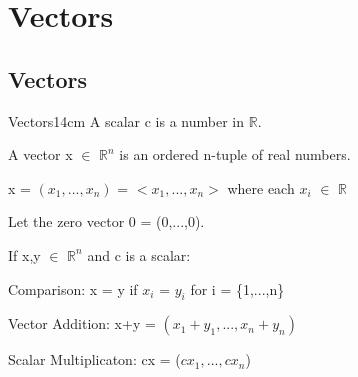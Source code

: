 \section[Day 1: Vectors]{ Vectors }

\subsection{ Vectors }

    \begin{definition}{Vectors}{14cm}
        A {\color{lblue} scalar} c is a number in $\mathbb{R}$.

        A {\color{lblue} vector} x $\in$ $\mathbb{R}^n$
        is an ordered n-tuple of real numbers.

        \hspace{0.5cm}
        x = $(x_1,...,x_n)$ = $<x_1,...,x_n>$
        \hspace{1cm}
        where each $x_i$ $\in$ $\mathbb{R}$

        Let the zero vector 0 = (0,...,0).

        \vspace{0.3cm}

        If x,y $\in$ $\mathbb{R}^n$ and c is a scalar:

        \hspace{0.5cm}
        Comparison:
        \hspace{2.5cm}
        x = y if $x_i$ = $y_i$ for i = \{1,...,n\}

        \hspace{0.5cm}
        Vector Addition:
        \hspace{1.75cm}
        x+y = $(x_1+y_1,...,x_n+y_n)$

        \hspace{0.5cm}
        Scalar Multiplicaton:
        \hspace{1cm}
        cx = ($cx_1,...,cx_n$)
    \end{definition}

